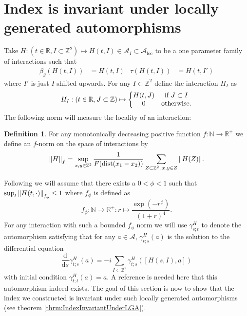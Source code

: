 \documentclass[12pt,a4paper,twoside]{article}
\renewcommand{\d}{\text{d}}
\let\originalleft\left
\let\originalright\right
\renewcommand{\left}{\mathopen{}\mathclose\bgroup\originalleft}
\renewcommand{\right}{\aftergroup\egroup\originalright}
\newcommand{\ZZ}{\mathbb Z}
\renewcommand{\AA}{\mathcal A}
\newcommand{\RR}{\mathbb R}
\newcommand{\NN}{\mathbb{N}}
\theoremstyle{definition}
\newtheorem{definition}[theorem]{Definition}
\numberwithin{equation}{section}
\begin{document}
\section{Index is invariant under locally generated automorphisms}\label{sec:IndexInvariantUnderLGA}
Take $H:(t\in\RR, I\subset \ZZ^2)\mapsto H(t,I)\in\AA_I\subset\AA_{\text{loc}}$ to be a one parameter family of interactions such that
\begin{align}
\beta_g(H(t,I))&=H(t,I)&\tau(H(t,I))&=H(t,I')
\end{align}
where $I'$ is just $I$ shifted upwards. For any $I\subset\ZZ^2$ define the interaction $H_I$ as
\begin{equation}
	H_I:(t\in\RR,J\subset\ZZ)\mapsto\left\{\begin{matrix}H(t,J)&\text{if }J\subset I\\0&\text{otherwise.}\end{matrix}\right.
\end{equation}
The following norm will measure the locality of an interaction:
\begin{definition}
For any monotonically decreasing positive function $f:\NN\rightarrow\RR^+$ we define an $f$-norm on the space of interactions by
\begin{equation}
	\norm{H}_f=\sup_{x,y\in\ZZ^2}\frac{1}{F(\textrm{dist}(x_1-x_2))}\sum_{Z\subset\ZZ^2,\:x,y\in Z}\norm{H(Z)}.
\end{equation}
\end{definition}
Following \cite{ogata2021h3gmathbb} we will assume that there exists a $0<\phi<1$ such that $\sup_t \norm{H(t,\cdot)}_{f_\phi}\leq 1$ where $f_\phi$ is defined as
\begin{equation}
	f_\phi:\NN\rightarrow\RR^+:r\mapsto \frac{\exp(-r^\phi)}{(1+r)^4}.
\end{equation}
For any interaction with such a bounded $f_\phi$ norm we will use $\gamma^H_{s;t}$ to denote the automorphism satisfying that for any $a\in\AA$, $\gamma^H_{t;s}(a)$ is the solution to the differential equation
\begin{equation}
	\frac{\d}{\d s}\gamma^H_{t;s}(a)=-i\sum_{I\subset \ZZ^2}\gamma^H_{t;s}([H(s,I),a])
\end{equation}
with initial condition $\gamma^H_{t;t}(a)=a$. {\color{red}A reference is needed here that this automorphism indeed exists.} The goal of this section is now to show that the index we constructed is invariant under such locally generated automorphisms (see theorem \ref{thrm:IndexInvariantUnderLGA}).
\end{document}
